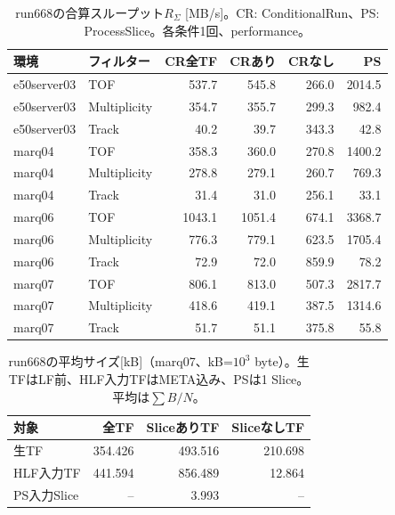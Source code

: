 \begin{table}[H]\centering\small
\caption{run668の合算スループット$R_\Sigma$ [MB/s]。CR: ConditionalRun、PS: ProcessSlice。各条件1回、performance。}
\begin{tabular}{llrrrr}\hline
環境 & フィルター & CR全TF & CRあり & CRなし & PS \\\hline
e50server03 & TOF & 537.7 & 545.8 & 266.0 & 2014.5 \\
e50server03 & Multiplicity & 354.7 & 355.7 & 299.3 & 982.4 \\
e50server03 & Track & 40.2 & 39.7 & 343.3 & 42.8 \\
marq04 & TOF & 358.3 & 360.0 & 270.8 & 1400.2 \\
marq04 & Multiplicity & 278.8 & 279.1 & 260.7 & 769.3 \\
marq04 & Track & 31.4 & 31.0 & 256.1 & 33.1 \\
marq06 & TOF & 1043.1 & 1051.4 & 674.1 & 3368.7 \\
marq06 & Multiplicity & 776.3 & 779.1 & 623.5 & 1705.4 \\
marq06 & Track & 72.9 & 72.0 & 859.9 & 78.2 \\
marq07 & TOF & 806.1 & 813.0 & 507.3 & 2817.7 \\
marq07 & Multiplicity & 418.6 & 419.1 & 387.5 & 1314.6 \\
marq07 & Track & 51.7 & 51.1 & 375.8 & 55.8 \\
\hline\end{tabular}\end{table}
\begin{table}[H]\centering\small
\caption{run668の平均サイズ[kB]（marq07、kB=$10^3$ byte）。生TFはLF前、HLF入力TFはMETA込み、PSは1 Slice。平均は$\sum B/N$。}
\begin{tabular}{lrrr}\hline 対象 & 全TF & SliceありTF & SliceなしTF \\\hline
生TF & 354.426 & 493.516 & 210.698 \\
HLF入力TF & 441.594 & 856.489 & 12.864 \\
PS入力Slice & -- & 3.993 & -- \\
\hline\end{tabular}\end{table}
